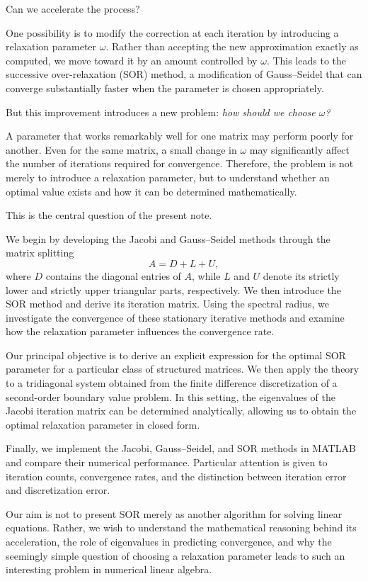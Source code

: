 \documentclass[11pt,a4paper]{article}
\theoremstyle{definition}
\theoremstyle{remark}
\begin{document}
Can we accelerate the process?

One possibility is to modify the correction at
each iteration by introducing a relaxation
parameter $\omega$. Rather than accepting the
new approximation exactly as computed, we move
toward it by an amount controlled by $\omega$.
This leads to the successive over-relaxation
(SOR) method, a modification of Gauss--Seidel
that can converge substantially faster when
the parameter is chosen appropriately.

But this improvement introduces a new problem:
\emph{how should we choose $\omega$?}

A parameter that works remarkably well for one
matrix may perform poorly for another. Even for
the same matrix, a small change in $\omega$ may
significantly affect the number of iterations
required for convergence. Therefore, the problem
is not merely to introduce a relaxation parameter,
but to understand whether an optimal value exists
and how it can be determined mathematically.

This is the central question of the present note.

We begin by developing the Jacobi and Gauss--Seidel
methods through the matrix splitting
\[
    A=D+L+U,
\]
where $D$ contains the diagonal entries of $A$,
while $L$ and $U$ denote its strictly lower and
strictly upper triangular parts, respectively.
We then introduce the SOR method and derive its
iteration matrix. Using the spectral radius, we
investigate the convergence of these stationary
iterative methods and examine how the relaxation
parameter influences the convergence rate.

Our principal objective is to derive an explicit
expression for the optimal SOR parameter for a
particular class of structured matrices. We
then apply the theory to a tridiagonal system
obtained from the finite difference discretization
of a second-order boundary value problem. In
this setting, the eigenvalues of the Jacobi
iteration matrix can be determined analytically,
allowing us to obtain the optimal relaxation
parameter in closed form.

Finally, we implement the Jacobi, Gauss--Seidel,
and SOR methods in MATLAB and compare their
numerical performance. Particular attention
is given to iteration counts, convergence
rates, and the distinction between iteration
error and discretization error.

Our aim is not to present SOR merely as another
algorithm for solving linear equations. Rather,
we wish to understand the mathematical reasoning
behind its acceleration, the role of eigenvalues
in predicting convergence, and why the seemingly
simple question of choosing a relaxation parameter
leads to such an interesting problem in numerical
linear algebra.
\end{document}
